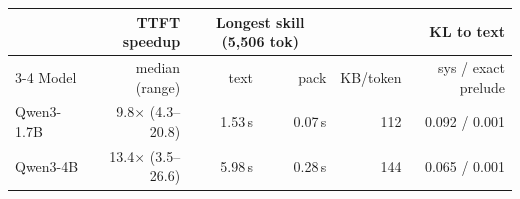 \begin{tabular}{lrrrrr}
\toprule
& TTFT speedup & \multicolumn{2}{c}{Longest skill (5{,}506 tok)} & & KL to text \\
\cmidrule(lr){3-4}
Model & median (range) & text & pack & KB/token & sys / exact prelude \\
\midrule
Qwen3-1.7B & 9.8$\times$ (4.3--20.8) & 1.53\,s & 0.07\,s & 112 & 0.092 / 0.001 \\
Qwen3-4B & 13.4$\times$ (3.5--26.6) & 5.98\,s & 0.28\,s & 144 & 0.065 / 0.001 \\
\bottomrule
\end{tabular}
